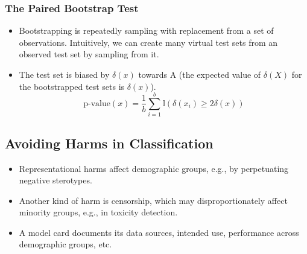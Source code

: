 \subsubsection{The Paired Bootstrap Test}

\begin{itemize}
  \item Bootstrapping is repeatedly sampling with replacement from a set of observations.
        Intuitively, we can create many virtual test sets from an observed test set by
        sampling from it.
  \item The test set is biased by $\delta(x)$ towards A (the expected value of $\delta(X)$ for the bootstrapped test sets is $\delta(x)$).
        \begin{equation}
          \text{p-value}(x) = \frac{1}{b} \sum_{i = 1}^{b} \mathbb{I}(\delta(x_i) \geq 2 \delta(x))
        \end{equation}
\end{itemize}

\subsection{Avoiding Harms in Classification}

\begin{itemize}
  \item Representational harms affect demographic groups, e.g., by perpetuating negative sterotypes.
  \item Another kind of harm is censorship, which may disproportionately affect minority groups, e.g., in toxicity detection.
  \item A model card documents its data sources, intended use, performance across demographic groups, etc.
\end{itemize}

